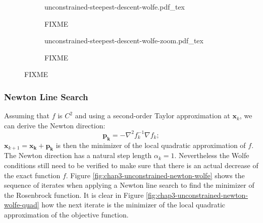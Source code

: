 \begin{figure}
  \centering
  \begin{subfigure}{0.8\columnwidth}
    \centering
        {\def\svgwidth{\linewidth}
          {\footnotesize
            
                       {unconstrained-steepest-descent-wolfe.pdf_tex}
          }
        }
        \caption{FIXME}
        \label{fig:chap3-unconstrained-steepest-descent-wolfe-a}
  \end{subfigure}
  \begin{subfigure}{0.8\columnwidth}
    \centering
        {\def\svgwidth{\linewidth}
          {\footnotesize
            
                       {unconstrained-steepest-descent-wolfe-zoom.pdf_tex}
          }
        }
        \caption{FIXME}
        \label{fig:chap3-unconstrained-steepest-descent-wolfe-b}
  \end{subfigure}
  \caption{FIXME}
  \label{fig:chap3-unconstrained-steepest-descent-wolfe}
\end{figure}

\subsubsection{Newton Line Search}

Assuming that $f$ is $C^2$ and using a second-order Taylor
approximation at $\mathbf{x}_k$, we can derive the Newton direction:
\begin{equation}
\mathbf{p_k} = -\nabla^2 f_k^{-1} \nabla f_k;
\end{equation}
$\mathbf{x}_{k+1}=\mathbf{x_k}+\mathbf{p_k}$ is then the minimizer of
the local quadratic approximation of $f$. The Newton direction has a
natural step length $\alpha_k=1$. Nevertheless the Wolfe conditions
still need to be verified to make sure that there is an actual
decrease of the exact function $f$. Figure
\ref{fig:chap3-unconstrained-newton-wolfe} shows the sequence of
iterates when applying a Newton line search to find the minimizer of
the Rosenbrock function. It is clear in Figure
\ref{fig:chap3-unconstrained-newton-wolfe-quad} how the next iterate
is the minimizer of the local quadratic approximation of the objective
function.

